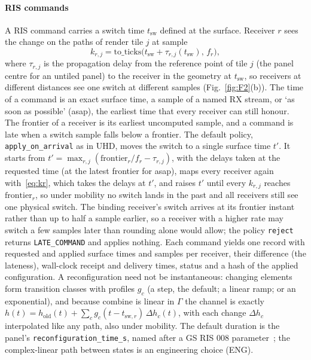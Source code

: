 \paragraph*{RIS commands}
A RIS command carries a switch time $t_{\mathrm{sw}}$ defined at the
surface. Receiver $r$ sees the change on the paths of render tile $j$ at sample
\begin{equation}
k_{r,j}=\mathrm{to\_ticks}\bigl(t_{\mathrm{sw}}+\tau_{r,j}(t_{\mathrm{sw}}),\,f_r\bigr),
\label{eq:kr}
\end{equation}
where $\tau_{r,j}$ is the propagation delay from the reference point of tile $j$ (the panel
centre for an untiled panel) to the receiver in the geometry at $t_{\mathrm{sw}}$, so
receivers at different distances see one switch at different samples (Fig.~\ref{fig:F2}(b)).
The time of a command is an exact surface time, a sample of a named RX stream, or `as soon as
possible' (asap), the earliest time that every receiver can still honour.
The frontier of a receiver is its earliest uncomputed sample, and a command
is late when a switch sample falls below a frontier. The default policy,
\texttt{apply\_on\_arrival} as in UHD, moves the switch to a single surface time $t'$. It
starts from $t'=\max_{r,j}(\mathrm{frontier}_r/f_r-\tau_{r,j})$, with the delays taken at the
requested time (at the latest frontier for asap), maps every receiver again
with~\eqref{eq:kr}, which takes the delays at $t'$, and raises $t'$ until every $k_{r,j}$
reaches $\mathrm{frontier}_r$, so under mobility no switch lands in the past and all receivers
still see one physical switch. The binding receiver's switch arrives at its frontier instant
rather than up to half a sample earlier, so a receiver with a higher rate may switch a few
samples later than rounding alone would allow; the policy
\texttt{reject} returns \texttt{LATE\_COMMAND} and applies nothing.
Each command yields one record with requested and applied surface times and
samples per receiver, their difference (the lateness), wall-clock receipt and delivery times,
status and a hash of the applied configuration.
A reconfiguration need not be instantaneous: changing elements form
transition classes with profiles $g_c$ (a step, the default; a linear ramp; or an
exponential), and because $\mathrm{combine}$ is linear in $\Gamma$ the channel is exactly
$h(t)=h_{\mathrm{old}}(t)+\sum_c g_c(t-t_{\mathrm{sw},r})\,\Delta h_c(t)$, with each change
$\Delta h_c$ interpolated like any path, also under mobility. The default duration is the
panel's \texttt{reconfiguration\_time\_s}, named after a GS RIS 008
parameter~\cite{ETSI_GS_RIS008}; the complex-linear path between states is an engineering
choice (ENG).

